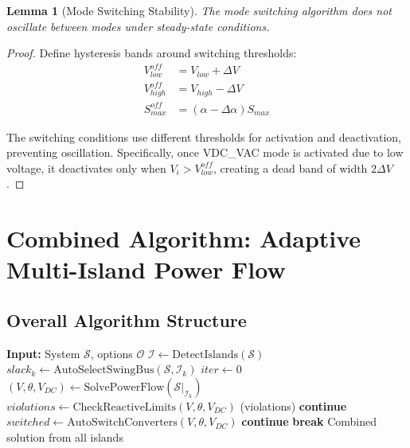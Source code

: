 \documentclass[11pt]{article}
\newtheorem{lemma}{Lemma}
\begin{document}
\begin{lemma}[Mode Switching Stability]
The mode switching algorithm does not oscillate between modes under steady-state conditions.
\end{lemma}

\begin{proof}
Define hysteresis bands around switching thresholds:
\begin{align}
V_{low}^{off} &= V_{low} + \Delta V \\
V_{high}^{off} &= V_{high} - \Delta V \\
S_{max}^{off} &= (\alpha - \Delta\alpha) S_{max}
\end{align}

The switching conditions use different thresholds for activation and deactivation, preventing oscillation. Specifically, once VDC\_VAC mode is activated due to low voltage, it deactivates only when $V_i > V_{low}^{off}$, creating a dead band of width $2\Delta V$.
\end{proof}

\section{Combined Algorithm: Adaptive Multi-Island Power Flow}

\subsection{Overall Algorithm Structure}

\begin{algorithm}
\caption{Adaptive Multi-Island Power Flow}
\begin{algorithmic}[1]
\STATE \textbf{Input:} System $\mathcal{S}$, options $\mathcal{O}$
\STATE $\mathcal{I} \leftarrow \text{DetectIslands}(\mathcal{S})$
        \STATE $slack_k \leftarrow \text{AutoSelectSwingBus}(\mathcal{S}, \mathcal{I}_k)$
    \ENDIF
    \STATE $iter \leftarrow 0$
    \REPEAT
        \STATE $(V, \theta, V_{DC}) \leftarrow \text{SolvePowerFlow}(\mathcal{S}|_{\mathcal{I}_k})$
            \STATE $violations \leftarrow \text{CheckReactiveLimits}(V, \theta, V_{DC})$
                \STATE {}(violations)
                \STATE \textbf{continue}
            \ENDIF
        \ENDIF
            \STATE $switched \leftarrow \text{AutoSwitchConverters}(V, \theta, V_{DC})$
                \STATE \textbf{continue}
            \ENDIF
        \ENDIF
        \STATE \textbf{break} 
\ENDFOR
\RETURN Combined solution from all islands
\end{algorithmic}
\end{algorithm}
\end{document}
